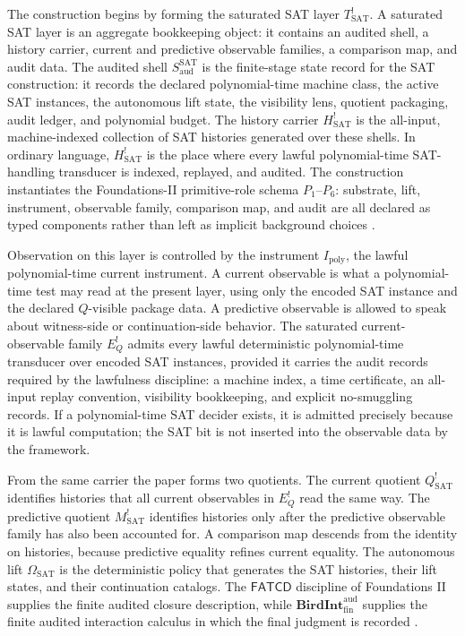 \documentclass[11pt]{article}
\newcommand{\Tsat}{T^{!}_{\mathrm{SAT}}}
\newcommand{\Saud}{S_{\mathrm{aud}}^{\mathrm{SAT}}}
\newcommand{\Hsat}{H^{!}_{\mathrm{SAT}}}
\newcommand{\Ipoly}{I_{\mathrm{poly}}}
\newcommand{\EQbang}{E^{!}_{Q}}
\newcommand{\Qsat}{Q^{!}_{\mathrm{SAT}}}
\newcommand{\Msat}{M^{!}_{\mathrm{SAT}}}
\newcommand{\OmegaSAT}{\Omega_{\mathrm{SAT}}}
\newcommand{\FATCD}{\mathsf{FATCD}}
\newcommand{\BirdInt}{\mathbf{BirdInt}^{\mathrm{aud}}_{\mathrm{fin}}}
\theoremstyle{definition}
\begin{document}
The construction begins by forming the saturated SAT layer
\(\Tsat\).  A saturated SAT layer is an aggregate bookkeeping object:
it contains an audited shell, a history carrier, current and
predictive observable families, a comparison map, and audit data.  The
audited shell \(\Saud\) is the finite-stage state record for the SAT
construction: it records the declared polynomial-time machine class,
the active SAT instances, the autonomous lift state, the visibility
lens, quotient packaging, audit ledger, and polynomial budget.  The
history carrier \(\Hsat\) is the all-input, machine-indexed collection
of SAT histories generated over these shells.  In ordinary language,
\(\Hsat\) is the place where every lawful polynomial-time SAT-handling
transducer is indexed, replayed, and audited.  The construction
instantiates the Foundations-II primitive-role schema \(P_{1}\)--\(P_{6}\):
substrate, lift, instrument, observable family, comparison map, and
audit are all declared as typed components rather than left as
implicit background choices \citep{TsiokosFoundationsII2026}.

Observation on this layer is controlled by the instrument \(\Ipoly\),
the lawful polynomial-time current instrument.  A current observable is
what a polynomial-time test may read at the present layer, using only
the encoded SAT instance and the declared \(Q\)-visible package data.
A predictive observable is allowed to speak about witness-side or
continuation-side behavior.  The saturated current-observable family
\(\EQbang\) admits every lawful deterministic polynomial-time
transducer over encoded SAT instances, provided it carries the audit
records required by the lawfulness discipline: a machine index, a time
certificate, an all-input replay convention, visibility bookkeeping,
and explicit no-smuggling records.  If a polynomial-time SAT decider
exists, it is admitted precisely because it is lawful computation; the
SAT bit is not inserted into the observable data by the framework.

From the same carrier the paper forms two quotients.  The current
quotient \(\Qsat\) identifies histories that all current observables
in \(\EQbang\) read the same way.  The predictive quotient \(\Msat\)
identifies histories only after the predictive observable family has
also been accounted for.  A comparison map descends from the identity
on histories, because predictive equality refines current equality.
The autonomous lift \(\OmegaSAT\) is the deterministic policy that
generates the SAT histories, their lift states, and their continuation
catalogs.  The \(\FATCD\) discipline of Foundations II supplies the
finite audited closure description, while \(\BirdInt\) supplies the
finite audited interaction calculus in which the final judgment is
recorded \citep{TsiokosFoundationsII2026,TsiokosFoundationsIII2026}.
\end{document}
